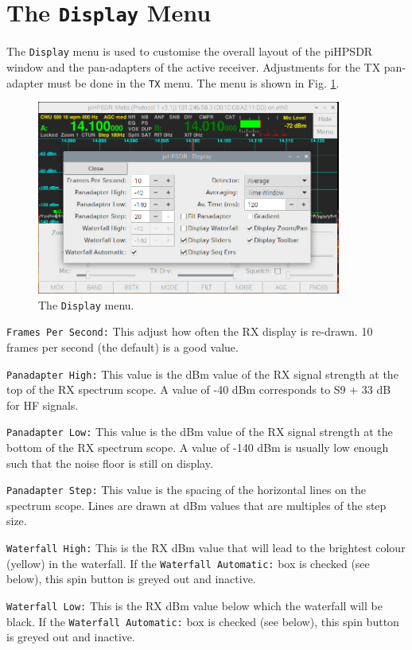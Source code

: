 \documentclass[12pt]{book}
\def\rett#1{\texttt{\color{red}#1}}
\def\bltt#1{\texttt{\color{blue}#1}}
\def\pH{pi\-HPSDR }
\begin{document}
\section{The \texttt{Display} Menu}

The \bltt{Display} menu is used to customise the overall layout of the \pH
window and the pan-adapters of the active receiver. Adjustments
for the TX pan-adapter must be done in the \bltt{TX} menu. The menu is shown
in Fig. \ref{fig:DisplayMenu}.

\begin{figure}[ht]
\center
\includegraphics[width=10cm]{DisplayMenu.png}
\caption{The \bltt{Display} menu.}
\label{fig:DisplayMenu}
\end{figure}

\rett{Frames Per Second:} This adjust how often the RX display is re-drawn.
10 frames per second (the default) is a good value.

\rett{Panadapter High:} This value is the dBm value of the RX signal strength at the
top of the RX spectrum scope. A value of -40 dBm corresponds to S9 + 33 dB for HF
signals.

\rett{Panadapter Low:} This value is the dBm value of the RX signal strength at the
bottom of the RX spectrum scope. A value of -140 dBm is usually low enough such that
the noise floor is still on display.

\rett{Panadapter Step:} This value is the spacing of the horizontal lines on
the spectrum scope. Lines are drawn at dBm values that are multiples of the step
size.

\rett{Waterfall High:} This is the RX dBm value that will lead to the brightest
colour (yellow) in the waterfall. If the \rett{Waterfall Automatic:} box is checked
(see below), this spin button is greyed out and inactive.

\rett{Waterfall Low:} This is the RX dBm value below which the waterfall will be black.
If the \rett{Waterfall Automatic:} box is checked
(see below), this spin button is greyed out and inactive.
\end{document}
